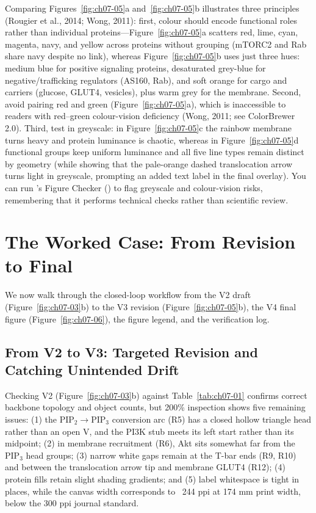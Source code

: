 Comparing Figures~\ref{fig:ch07-05}a and~\ref{fig:ch07-05}b illustrates three principles (Rougier et al., 2014; Wong, 2011): first, colour should encode functional roles rather than individual proteins---Figure~\ref{fig:ch07-05}a scatters red, lime, cyan, magenta, navy, and yellow across proteins without grouping (mTORC2 and Rab share navy despite no link), whereas Figure~\ref{fig:ch07-05}b uses just three hues: medium blue for positive signaling proteins, desaturated grey-blue for negative/trafficking regulators (AS160, Rab), and soft orange for cargo and carriers (glucose, GLUT4, vesicles), plus warm grey for the membrane. Second, avoid pairing red and green (Figure~\ref{fig:ch07-05}a), which is inaccessible to readers with red--green colour-vision deficiency (Wong, 2011; see ColorBrewer 2.0). Third, test in greyscale: in Figure~\ref{fig:ch07-05}c the rainbow membrane turns heavy and protein luminance is chaotic, whereas in Figure~\ref{fig:ch07-05}d functional groups keep uniform luminance and all five line types remain distinct by geometry (while showing that the pale-orange dashed translocation arrow turns light in greyscale, prompting an added text label in the final overlay). You can run \scidraw{}'s Figure Checker () to flag greyscale and colour-vision risks, remembering that it performs technical checks rather than scientific review.

\section{The Worked Case: From Revision to Final}

We now walk through the closed-loop workflow from the V2 draft (Figure~\ref{fig:ch07-03}b) to the V3 revision (Figure~\ref{fig:ch07-05}b), the V4 final figure (Figure~\ref{fig:ch07-06}), the figure legend, and the verification log.

\subsection{From V2 to V3: Targeted Revision and Catching Unintended Drift}

Checking V2 (Figure~\ref{fig:ch07-03}b) against Table~\ref{tab:ch07-01} confirms correct backbone topology and object counts, but 200\% inspection shows five remaining issues: (1) the $\text{PIP}_2 \rightarrow \text{PIP}_3$ conversion arc (R5) has a closed hollow triangle head rather than an open V, and the PI3K stub meets its left start rather than its midpoint; (2) in membrane recruitment (R6), Akt sits somewhat far from the $\text{PIP}_3$ head groups; (3) narrow white gaps remain at the T-bar ends (R9, R10) and between the translocation arrow tip and membrane GLUT4 (R12); (4) protein fills retain slight shading gradients; and (5) label whitespace is tight in places, while the canvas width corresponds to ~244 ppi at 174 mm print width, below the 300 ppi journal standard.


